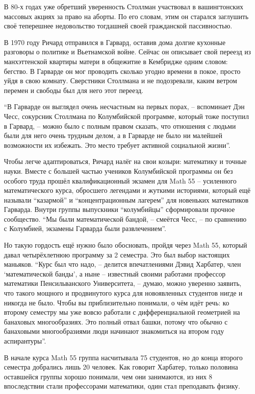 В 80-х годах уже обретший уверенность Столлман участвовал в вашингтонских массовых акциях за право на аборты. По его словам, этим он старался заглушить своё теперешнее недовольство тогдашней своей гражданской пассивностью.

В 1970 году Ричард отправился в Гарвард, оставив дома долгие кухонные разговоры о политике и Вьетнамской войне. Сейчас он описывает свой переезд из манхэттенской квартиры матери в общежитие в Кембридже одним словом: бегство. В Гарварде он мог проводить сколько угодно времени в покое, просто уйдя в свою комнату. Сверстники Столлмана и не подозревали, каким ветром перемен и свободы был для него этот переезд.

\enquote{В Гарварде он выглядел очень несчастным на первых порах, -- вспоминает Дэн Чесс, сокурсник Столлмана по Колумбийской программе, который тоже поступил в Гарвард, -- можно было с полным правом сказать, что отношения с людьми были для него очень трудным делом, а в Гарварде не было ни малейшей возможности их избежать. Это место требует активной социальной жизни}.

Чтобы легче адаптироваться, Ричард налёг на свои козыри: математику и точные науки. Вместе с большей частью учеников Колумбийской программы он без особого труда прошёл квалификационный экзамен для Math 55 -- усиленного математического курса, обросшего легендами и жуткими историями, который ещё называли \enquote{казармой} и \enquote{концентрационным лагерем} для новеньких математиков Гарварда. Внутри группы выпускники \enquote{колумбийцы} сформировали прочное сообщество. \enquote{Мы были математической бандой, -- смеётся Чесс, -- по сравнению с Колумбией, экзамены Гарварда были развлечением}.

Но такую гордость ещё нужно было обосновать, пройдя через Math 55, который давал четырёхлетнюю программу за 2 семестра. Это был выбор настоящих маньяков. \enquote{Курс был что надо, -- делится впечатлениями Дэвид Харбатер, член \enquote{математической банды}, а ныне -- известный своими работами профессор математики Пенсильванского Университета, -- думаю, можно уверенно заявить, что такого мощного и продвинутого курса для новоявленных студентов нигде и никогда не было. Чтобы вы приблизительно понимали, о чём идёт речь: ко второму семестру мы уже вовсю работали с дифференциальной геометрией на банаховых многообразиях. Это полный отвал башки, потому что обычно с банаховыми многообразиями люди начинают знакомиться на втором году аспирантуры}.

В начале курса Math 55 группа насчитывала 75 студентов, но до конца второго семестра добрались лишь 20 человек. Как говорит Харбатер, только половина оставшейся группы хорошо понимали, чем они занимаются, из них 8 впоследствии стали профессорами математики, один стал преподавать физику.


